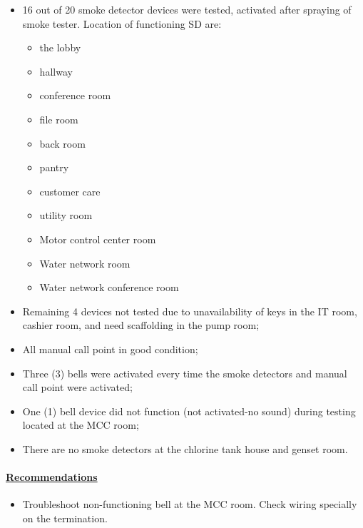\begin{itemize}
\item 16 out of 20 smoke detector devices were tested, activated after spraying of smoke tester. Location of functioning SD are:
\begin{itemize}
\item the lobby
\item hallway 
\item conference room 
\item file room
\item back room
\item pantry
\item customer care
\item utility room
\item Motor control center room
\item Water network room
\item Water network conference room
\end{itemize}

\item Remaining 4 devices not tested due to unavailability of keys in the IT room, cashier room, and need scaffolding in the pump room;
\item  All manual call point in good condition;
\item Three (3) bells were activated every time the smoke detectors and manual call point were activated;
\item One (1) bell device did not function (not activated-no sound) during testing located at the MCC room;
\item There are no smoke detectors at the chlorine tank house and genset room.
\end{itemize}






\paragraph{\underline{Recommendations}}

\begin{itemize}
\item Troubleshoot non-functioning bell at the MCC room. Check wiring specially on the termination.
\end{itemize}


